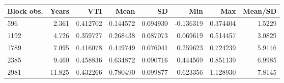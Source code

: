 \begin{tabular}{lrrrrrrr}
\toprule
Block obs. & Years & VTI & Mean & SD & Min & Max & Mean/SD \\
\midrule
596 & 2.361 & 0.412702 & 0.144572 & 0.094930 & -0.136319 & 0.374404 & 1.5229 \\
1192 & 4.726 & 0.359727 & 0.268438 & 0.087073 & 0.069619 & 0.514457 & 3.0829 \\
1789 & 7.095 & 0.416078 & 0.449749 & 0.076041 & 0.259623 & 0.724239 & 5.9146 \\
2385 & 9.460 & 0.458836 & 0.634872 & 0.090716 & 0.444569 & 0.851139 & 6.9985 \\
2981 & 11.825 & 0.432266 & 0.780490 & 0.099877 & 0.623356 & 1.128930 & 7.8145 \\
\bottomrule
\end{tabular}
